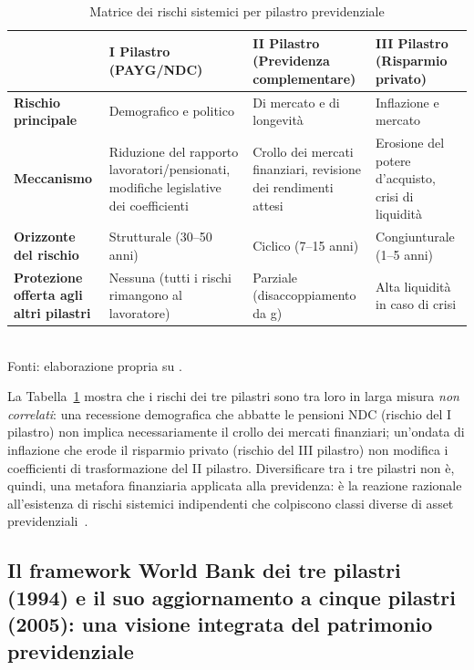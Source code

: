 \begin{table}[htbp]
\centering
\caption{Matrice dei rischi sistemici per pilastro previdenziale}
\label{tab:rischi_pilastri}
\begin{tabular}{p{3.2cm}p{3.5cm}p{4.0cm}p{3.5cm}}
\toprule
 & \textbf{I Pilastro} (PAYG/NDC) &
   \textbf{II Pilastro} (Previdenza complementare) &
   \textbf{III Pilastro} (Risparmio privato) \\
\midrule
\textbf{Rischio principale} &
  Demografico e politico &
  Di mercato e di longevità &
  Inflazione e mercato \\
\textbf{Meccanismo} &
  Riduzione del rapporto lavoratori/pensionati, modifiche legislative
  dei coefficienti &
  Crollo dei mercati finanziari, revisione dei rendimenti attesi &
  Erosione del potere d'acquisto, crisi di liquidità \\
\textbf{Orizzonte del rischio} &
  Strutturale (30--50 anni) &
  Ciclico (7--15 anni) &
  Congiunturale (1--5 anni) \\
\textbf{Protezione offerta agli altri pilastri} &
  Nessuna (tutti i rischi rimangono al lavoratore) &
  Parziale (disaccoppiamento da g) &
  Alta liquidità in caso di crisi \\
\bottomrule
\end{tabular}
\smallskip\\
\footnotesize
Fonti: elaborazione propria su \cite{WorldBank1994, WorldBank2005, Bosi2018}.
\end{table}

La Tabella~\ref{tab:rischi_pilastri} mostra che i rischi dei tre pilastri
sono tra loro in larga misura \emph{non correlati}: una recessione demografica
che abbatte le pensioni NDC (rischio del I pilastro) non implica
necessariamente il crollo dei mercati finanziari; un'ondata di inflazione
che erode il risparmio privato (rischio del III pilastro) non modifica
i coefficienti di trasformazione del II pilastro. Diversificare tra i tre
pilastri non è, quindi, una metafora finanziaria applicata alla previdenza:
è la reazione razionale all'esistenza di rischi sistemici indipendenti che
colpiscono classi diverse di asset previdenziali~\cite{WorldBank2005}.

\subsection{Il framework World Bank dei tre pilastri (1994)
            e il suo aggiornamento a cinque pilastri (2005):
            una visione integrata del patrimonio previdenziale}
\label{subsec:world_bank}

